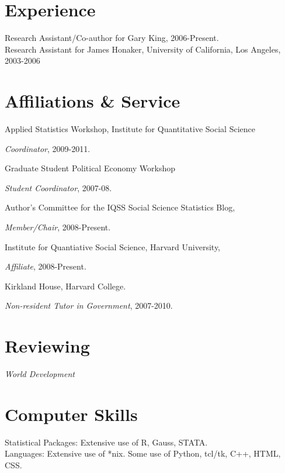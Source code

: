 \documentclass[margin,line]{res}
\newenvironment{list1}{
  \begin{list}{\ding{113}}{%
      \setlength{\itemsep}{0in}
      \setlength{\parsep}{0in} \setlength{\parskip}{0in}
      \setlength{\topsep}{0in} \setlength{\partopsep}{0in} 
      \setlength{\leftmargin}{0.17in}}}{\end{list}}
\begin{document}
\begin{resume}
\section{\sc Experience}
Research Assistant/Co-author for Gary King, 2006-Present.\\
Research Assistant for James Honaker, University of California, Los Angeles, 2003-2006

\section{\sc Affiliations \& Service}

Applied Statistics Workshop, Institute for Quantitative
Social Science 
\begin{list1}
\item[] \emph{Coordinator}, 2009-2011.
\end{list1}
\vspace{-1em}
Graduate Student Political Economy Workshop
\begin{list1} 
\item[] \emph{Student Coordinator}, 2007-08.
\end{list1} \vspace{-1em}
Author's Committee for the IQSS Social Science Statistics Blog,
\begin{list1}
\item[]\emph{Member/Chair}, 2008-Present.
\end{list1} \vspace{-1em}
Institute for Quantiative Social Science, Harvard University,
\begin{list1}
\item[] \emph{Affiliate}, 2008-Present.
\end{list1} \vspace{-1em}
 Kirkland House, Harvard College. 
\begin{list1}
\item[] \emph{Non-resident Tutor in Government}, 2007-2010.
\end{list1}

\section{\sc Reviewing }
\emph{World Development}

\section{\sc Computer Skills} 
Statistical Packages:  Extensive use of R, Gauss, STATA.\\
Languages: Extensive use of *nix. Some use of Python, tcl/tk, C++, HTML, CSS.

\end{resume}
\end{document}
